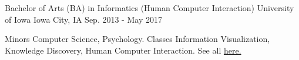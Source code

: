 \begin{cventries}
  \cventry
    {Bachelor of Arts (BA) in Informatics (Human Computer Interaction)}
    {University of Iowa}
    {Iowa City, IA}
    {Sep. 2013 - May 2017}
    {
      \begin{cvitemEs}
        \begin{cvskills}
          \cvskill
            {Minors}
            {Computer Science, Psychology.}
          \cvskill
            {Classes}
            {Information Visualization, Knowledge Discovery, Human Computer Interaction. See all \href{https://www.github.com/ryan-p-larson/college-sankey/}{here.}}
        \end{cvskills}
      \end{cvitemEs}
    }
\end{cventries}
